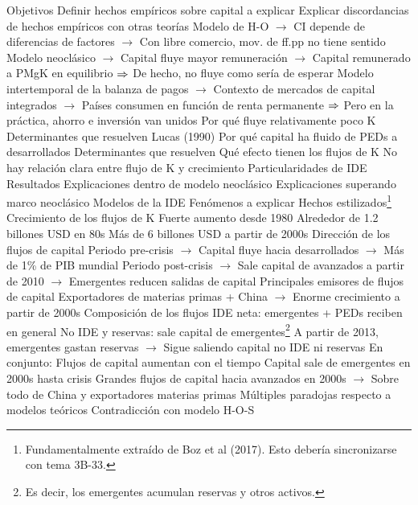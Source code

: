 \documentclass{nuevotema}
\begin{document}
\begin{esquemal}
			\3 Objetivos
				\4 Definir hechos empíricos sobre capital a explicar
				\4 Explicar discordancias de hechos empíricos con otras teorías
				\4[] Modelo de H-O
				\4[] $\to$ CI depende de diferencias de factores
				\4[] $\to$ Con libre comercio, mov. de ff.pp no tiene sentido
				\4[] Modelo neoclásico
				\4[] $\to$ Capital fluye mayor remuneración
				\4[] $\to$ Capital remunerado a PMgK en equilibrio
				\4[] $\then$ De hecho, no fluye como sería de esperar
				\4[] Modelo intertemporal de la balanza de pagos
				\4[] $\to$ Contexto de mercados de capital integrados
				\4[] $\to$ Países consumen en función de renta permanente
				\4[] $\then$ Pero en la práctica, ahorro e inversión van unidos
				\4 Por qué fluye relativamente poco K
				\4[] Determinantes que resuelven Lucas (1990)
				\4 Por qué capital ha fluido de PEDs a desarrollados
				\4[] Determinantes que resuelven
				\4 Qué efecto tienen los flujos de K
				\4[] No hay relación clara entre flujo de K y crecimiento
				\4 Particularidades de IDE
			\3 Resultados
				\4 Explicaciones dentro de modelo neoclásico
				\4 Explicaciones superando marco neoclásico
				\4 Modelos de la IDE
		\2 Fenómenos a explicar
			\3 Hechos estilizados\footnote{Fundamentalmente extraído de Boz et al (2017). Esto debería sincronizarse con tema 3B-33.}
				\4 Crecimiento de los flujos de K
				\4[] Fuerte aumento desde 1980
				\4[] Alrededor de 1.2 billones USD en 80s
				\4[] Más de 6 billones USD a partir de 2000s
				\4 Dirección de los flujos de capital
				\4[] Periodo pre-crisis
				\4[] $\to$ Capital fluye hacia desarrollados
				\4[] $\to$ Más de 1\% de PIB mundial
				\4[] Periodo post-crisis
				\4[] $\to$ Sale capital de avanzados a partir de 2010
				\4[] $\to$ Emergentes reducen salidas de capital
				\4 Principales emisores de flujos de capital
				\4[] Exportadores de materias primas + China
				\4[] $\to$ Enorme crecimiento a partir de 2000s
				\4 Composición de los flujos
				\4[] IDE neta: emergentes + PEDs reciben en general
				\4[] No IDE y reservas: sale capital de emergentes\footnote{Es decir, los emergentes acumulan reservas y otros activos.}
				\4[] A partir de 2013, emergentes gastan reservas
				\4[] $\to$ Sigue saliendo capital no IDE ni reservas
				\4 En conjunto:
				\4[] Flujos de capital aumentan con el tiempo
				\4[] Capital sale de emergentes en 2000s hasta crisis
				\4[] Grandes flujos de capital hacia avanzados en 2000s
				\4[] $\to$ Sobre todo de China y exportadores materias primas
				\4[$\then$] Múltiples paradojas respecto a modelos teóricos
			\3 Contradicción con modelo H-O-S

\end{esquemal}
\end{document}
